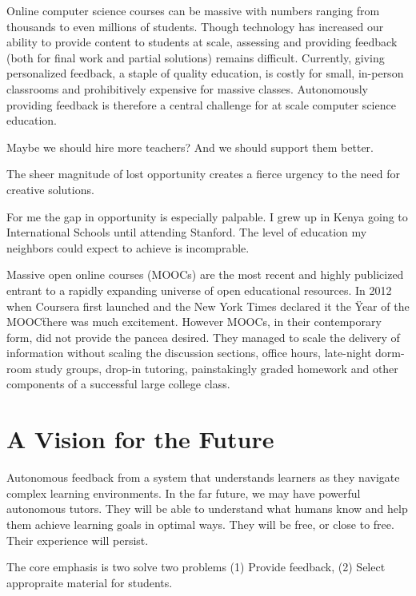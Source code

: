 
Online computer science courses can be massive
with numbers ranging from thousands to even millions of students.
Though technology has increased our ability to provide 
content
to students at scale, assessing and providing feedback 
(both for final work and partial solutions) remains difficult.
Currently, giving personalized feedback, a staple of quality education, is costly for small, in-person classrooms and prohibitively expensive for massive classes. 
Autonomously providing feedback is therefore 
a central challenge for at scale computer science education.






Maybe we should hire more teachers? And we should support them better.

The sheer magnitude of lost opportunity creates a fierce urgency to the need for creative solutions.

For me the gap in opportunity is especially palpable. I grew up in Kenya going to International Schools until attending Stanford. The level of education my neighbors could expect to achieve is incomprable.

Massive open online courses (MOOCs) are the most recent
and highly publicized entrant to a rapidly expanding
universe of open educational resources.
In 2012 when Coursera first launched and the New York Times declared it the \"Year of the MOOC\" there was much excitement. However MOOCs, in their contemporary form, did not provide the pancea desired. They managed to scale the delivery of information without scaling the discussion sections, office hours, late-night dorm-room study groups, drop-in tutoring, painstakingly graded homework and other components of a successful large college class. 

\section{A Vision for the Future}
Autonomous feedback from a system that understands learners as they navigate complex learning environments.
In the far future, we may have powerful autonomous tutors. They will be able to understand what humans know and help them achieve learning goals in optimal ways. They will be free, or close to free. Their experience will persist. 

The core emphasis is two solve two problems (1) Provide feedback, (2) Select appropraite material for students. 

